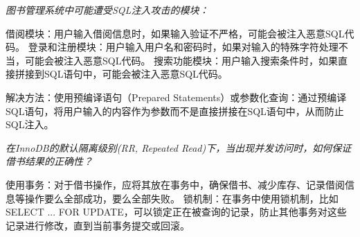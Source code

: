 \documentclass{ctexart}
\begin{document}
\textit{图书管理系统中可能遭受SQL注入攻击的模块：}

借阅模块：用户输入借阅信息时，如果输入验证不严格，可能会被注入恶意SQL代码。
登录和注册模块：用户输入用户名和密码时，如果对输入的特殊字符处理不当，可能会被注入恶意SQL代码。
搜索功能模块：用户输入搜索条件时，如果直接拼接到SQL语句中，可能会被注入恶意SQL代码。

解决方法：使用预编译语句（Prepared Statements）或参数化查询：通过预编译SQL语句，将用户输入的内容作为参数而不是直接拼接在SQL语句中，从而防止SQL注入。

\textit{在InnoDB的默认隔离级别(RR, Repeated Read)下，当出现并发访问时，如何保证借书结果的正确性？}

使用事务：对于借书操作，应将其放在事务中，确保借书、减少库存、记录借阅信息等操作要么全部成功，要么全部失败。
锁机制：在事务中使用锁机制，比如SELECT ... FOR UPDATE，可以锁定正在被查询的记录，防止其他事务对这些记录进行修改，直到当前事务提交或回滚。
\end{document}
